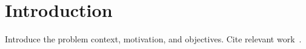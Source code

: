 \section{Introduction}
\label{sec:introduction}

Introduce the problem context, motivation, and objectives. Cite relevant work~\cite{einstein1905}.
